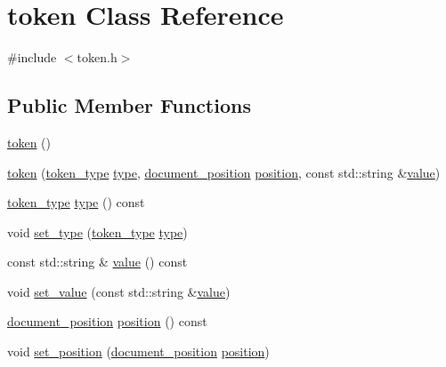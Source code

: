 \hypertarget{classtoken}{}\section{token Class Reference}
\label{classtoken}


{\ttfamily \#include $<$token.\+h$>$}

\subsection*{Public Member Functions}
\begin{DoxyCompactItemize}
\item 
\mbox{\hyperlink{classtoken_a91d47c8b276e40caa47e2fe678135417}{token}} ()
\item 
\mbox{\hyperlink{classtoken_ac6db120070abce4758114c5882ef0006}{token}} (\mbox{\hyperlink{token_8h_afe5ef662303b6b710ea6ee1a944bad0d}{token\+\_\+type}} \mbox{\hyperlink{classtoken_ae4872e33fcec00c59c994c4c9ee3a1f5}{type}}, \mbox{\hyperlink{structdocument__position}{document\+\_\+position}} \mbox{\hyperlink{classtoken_a3bd56df2d1b1afe17b696ffd6c2d7482}{position}}, const std\+::string \&\mbox{\hyperlink{classtoken_aebc1e280e783cda819ca694efcbeb59a}{value}})
\item 
\mbox{\hyperlink{token_8h_afe5ef662303b6b710ea6ee1a944bad0d}{token\+\_\+type}} \mbox{\hyperlink{classtoken_a29f1fc3b00eb1923f38cac235c93758a}{type}} () const
\item 
void \mbox{\hyperlink{classtoken_afd4182d22aed4f89e9f8e3cf93689c73}{set\+\_\+type}} (\mbox{\hyperlink{token_8h_afe5ef662303b6b710ea6ee1a944bad0d}{token\+\_\+type}} \mbox{\hyperlink{classtoken_ae4872e33fcec00c59c994c4c9ee3a1f5}{type}})
\item 
const std\+::string \& \mbox{\hyperlink{classtoken_a428b079df3ca8461819f181a3e27504e}{value}} () const
\item 
void \mbox{\hyperlink{classtoken_ab814a9dc7135593a8be438fbce5c0209}{set\+\_\+value}} (const std\+::string \&\mbox{\hyperlink{classtoken_aebc1e280e783cda819ca694efcbeb59a}{value}})
\item 
\mbox{\hyperlink{structdocument__position}{document\+\_\+position}} \mbox{\hyperlink{classtoken_a5d51a27a6e2c80da1d237bb2a2ce5f94}{position}} () const
\item 
void \mbox{\hyperlink{classtoken_a39861264959b5276f7c8c6fbd6047bc6}{set\+\_\+position}} (\mbox{\hyperlink{structdocument__position}{document\+\_\+position}} \mbox{\hyperlink{classtoken_a3bd56df2d1b1afe17b696ffd6c2d7482}{position}})
\end{DoxyCompactItemize}


